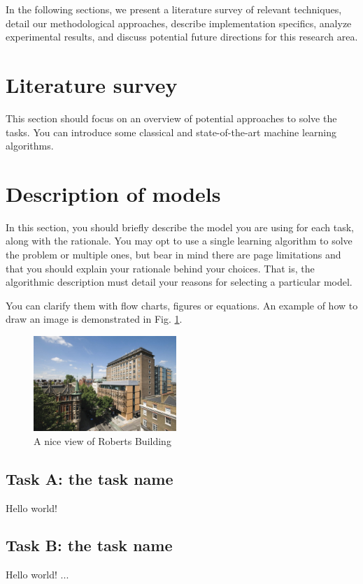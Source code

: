 \documentclass{article}
\begin{document}
In the following sections, we present a literature survey of relevant techniques, detail our methodological approaches, describe implementation specifics, analyze experimental results, and discuss potential future directions for this research area.


\section{Literature survey}
\label{sec:lite}
    This section should focus on an overview of potential approaches to solve the tasks. You can introduce some classical and state-of-the-art machine learning algorithms.


\section{Description of models}
\label{sec:models}
    In this section, you should briefly describe the model you are using for each task, along with the rationale. You may opt to use a single learning algorithm to solve the problem or multiple ones, but bear in mind there are page limitations and that you should explain your rationale behind your choices. That is, the algorithmic description must detail your reasons for selecting a particular model.
    
    You can clarify them with flow charts, figures or equations. An example of how to draw an image is demonstrated in Fig. \ref{fig:roberts_building}.
    
    \begin{figure}[htb]
    \centering
    \includegraphics[width=0.48\textwidth]{images/Roberts_building.jpg}
    \caption{A nice view of Roberts Building}
    \label{fig:roberts_building}
    \end{figure}
    
    \subsection{Task A: the task name}
    \label{ssec:desc_models_A1}
    Hello world!
    \subsection{Task B: the task name}
    \label{ssec:desc_models_B}
    Hello world!
    ...
    
\end{document}
